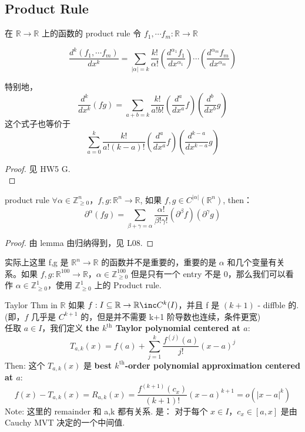 \documentclass[lang=cn,11pt]{elegantbook}
\begin{document}
\subsection{Product Rule}

\begin{lemma}{在 $\mathbb{R} \rightarrow \mathbb{R}$ 上的函数的 product rule}
令 $f_1, \cdots f_m: \mathbb{R} \rightarrow \mathbb{R}$

$$
\frac{d^k {(f_1,\cdots f_m)}}{dx^k} = \sum_{|\alpha| = k} \frac{k!}{\alpha !} (\frac{d^{\alpha_1} f_1}{dx^{\alpha_1}}) \cdots (\frac{d^{\alpha_m} f_m}{dx^{\alpha_m}})
$$

\end{lemma}

\begin{note}
    特别地，$$
    \frac{d^k}{dx^k} (fg) = \sum_{a+b = k} \frac{k!}{a!b!} (\frac{d^a}{dx^a}f) (\frac{d^b}{dx^b} g)
    $$
    这个式子也等价于 $$
    \sum_{a = 0}^k \frac{k!}{a!(k-a)!} (\frac{d^a}{dx^a}f) (\frac{d^{k-a}}{dx^{k-a}} g)
    $$
\end{note}

\begin{proof}
    见 HW5 G. \\
\end{proof}

\begin{theorem}{product rule} \label{product rule}
$\forall \alpha \in \mathbb{Z}_{\geq 0}^n$，$f,g: \mathbb{R}^n \rightarrow \mathbb{R}$, 如果 $f,g \in C^{|\alpha|} (\mathbb{R}^n)$, then：
$$
\partial^{\alpha} (fg) = \sum_{\beta + \gamma = \alpha} \frac{\alpha !}{\beta ! \gamma !} (\partial ^ \beta f) (\partial ^ \gamma g)
$$
\end{theorem}
\begin{proof}
    由 lemma 由归纳得到，见 L08.
\end{proof}
\begin{note}
    实际上这里 f,g 是 $\mathbb{R}^n \rightarrow \mathbb{R}$ 的函数并不是重要的，重要的是 $\alpha$ 和几个变量有关系。如果 $f,g:\mathbb{R}^{100} \rightarrow \mathbb{R} $，$\alpha \in \mathbb{Z}_{\geq 0} ^{100}$ 但是只有一个 entry 不是 0，那么我们可以看作 $\alpha \in \mathbb{Z}_{\geq 0}^1$，使用 $\mathbb{Z}_{\geq 0}^1$ 上的 Product rule.
\end{note}


\begin{lemma}{Taylor Thm in $\mathbb{R}$}
如果 $f: I \subseteq \mathbb{R} \rightarrow \mathbb{R} \inc C^k(I)$，并且 f 是 $(k+1)$ - diffble 的.\\
(即，$f$ 几乎是 $C^{k+1}$ 的，但是并不需要 k+1 阶导数也连续，条件更宽)\\
任取 $a \in I$，我们定义 \textbf{the $k^\text{th}$ Taylor polynomial centered at $a$}:
$$
T_{a,k}(x) = f(a) + \sum_{j=1}^k \frac{f^{(j)}(a)}{j!} (x-a)^j
$$
Then: 这个 $T_{a,k}(x)$ 是 \textbf{best $k^\text{th}$-order polynomial approximation centered at $a$}: $$
f(x) - T_{a,k}(x) =  R_{a,k} (x) = \frac{f^{(k+1)}(c_x)}{(k+1)!} (x-a)^{k+1} = o(|x-a|^k)
$$
Note: 这里的 remainder 和 a,k 都有关系. 是：
对于每个 $x \in I$，$c_x \in [a,x]$ 是由 Cauchy MVT 决定的一个中间值.
\end{lemma}
\end{document}
